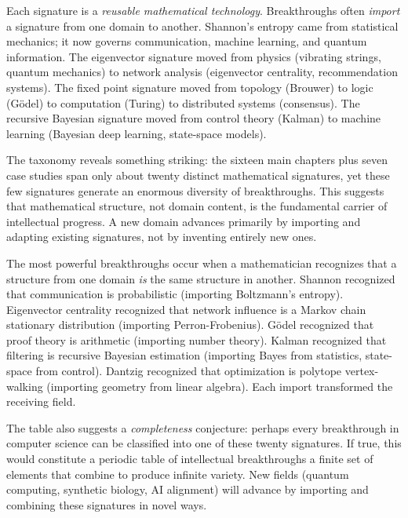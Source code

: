Each signature is a \emph{reusable mathematical technology}. Breakthroughs often \emph{import} a signature from one domain to another. Shannon's entropy came from statistical mechanics; it now governs communication, machine learning, and quantum information. The eigenvector signature moved from physics (vibrating strings, quantum mechanics) to network analysis (eigenvector centrality, recommendation systems). The fixed point signature moved from topology (Brouwer) to logic (G\"odel) to computation (Turing) to distributed systems (consensus). The recursive Bayesian signature moved from control theory (Kalman) to machine learning (Bayesian deep learning, state-space models).

The taxonomy reveals something striking: the sixteen main chapters plus seven case studies span only about twenty distinct mathematical signatures, yet these few signatures generate an enormous diversity of breakthroughs. This suggests that mathematical structure, not domain content, is the fundamental carrier of intellectual progress. A new domain advances primarily by importing and adapting existing signatures, not by inventing entirely new ones.

The most powerful breakthroughs occur when a mathematician recognizes that a structure from one domain \emph{is} the same structure in another. Shannon recognized that communication is probabilistic (importing Boltzmann's entropy). Eigenvector centrality recognized that network influence is a Markov chain stationary distribution (importing Perron-Frobenius). G\"odel recognized that proof theory is arithmetic (importing number theory). Kalman recognized that filtering is recursive Bayesian estimation (importing Bayes from statistics, state-space from control). Dantzig recognized that optimization is polytope vertex-walking (importing geometry from linear algebra). Each import transformed the receiving field.

The table also suggests a \emph{completeness} conjecture: perhaps every breakthrough in computer science can be classified into one of these twenty signatures. If true, this would constitute a periodic table of intellectual breakthroughs a finite set of elements that combine to produce infinite variety. New fields (quantum computing, synthetic biology, AI alignment) will advance by importing and combining these signatures in novel ways.

